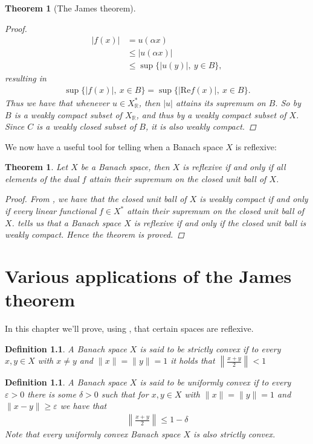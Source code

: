 \documentclass[10pt,twoside,openany,final]{memoir}
\theoremstyle{break}
\newtheorem{theorem}[section]{Theorem}
\newtheorem{definition}[section]{Definition}
\theoremstyle{Break}
\newcommand{\lv}{\lVert}
\newcommand{\rv}{\rVert}
\newcommand{\R}{\mathbb{R}}
\begin{document}
\begin{theorem}[The James theorem]
\begin{proof}
\begin{align*}
|f(x)| &= u(\alpha x) \\
&\leq |u(\alpha x)| \\
&\leq \sup \{ |u(y)|, \ y \in B\},
\end{align*}
resulting in
\begin{align*}
\sup\{ |f(x)| , \ x \in B \} = \sup \{ | \text{Re}f (x)|,\ x \in B\}.
\end{align*}
Thus we have that whenever $u \in X_{\R}^*$, then $|u|$ attains its supremum on $B$. So by  $B$ is a weakly compact subset of $X_{\R}$, and thus by  a weakly compact subset of $X$. Since $C$ is a weakly closed subset of $B$, it is also weakly compact. 
\end{proof}
\end{theorem}

\noindent We now have a useful tool for telling when a Banach space $X$ is reflexive:
\begin{theorem}\label{James'}
Let $X$ be a Banach space, then $X$ is reflexive if and only if all elements of the dual $f$ attain their supremum on the closed unit ball of $X$.
\begin{proof}
From , we have that the closed unit ball of $X$ is weakly compact if and only if every linear functional $f \in X^*$ attain their supremum on the closed unit ball of $X$.  tells us that a Banach space $X$ is reflexive if and only if the closed unit ball is weakly compact. Hence the theorem is proved.
\end{proof}
\end{theorem}
\chapter{Various applications of the James theorem}
In this chapter we'll prove, using , that certain spaces are reflexive.
\begin{definition}
A Banach space $X$ is said to be \emph{strictly convex} if to every $x,y \in X$ with $x\neq y$ and $\lv x \rv= \lv y \rv = 1$ it holds that $\left \lv \frac{x+y}{2} \right \rv <1$
\end{definition}

\begin{definition}
A Banach space $X$ is said to be \emph{uniformly convex} if to every $\varepsilon>0$ there is some $\delta >0$ such that for $x,y \in X$ with $\lv x \rv = \lv y \rv = 1$ and $\lv x-y \rv \geq \varepsilon$ we have that
\begin{align*}
\left\lv \frac{x+y}{2} \right\rv \leq 1-\delta
\end{align*}
\textit{Note that every uniformly convex Banach space $X$ is also strictly convex.}
\end{definition}
\end{document}
